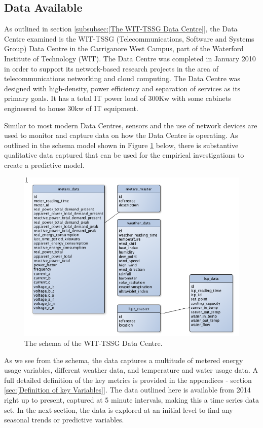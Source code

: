 \documentclass[12pt]{scrartcl}
\begin{document}
\subsection{Data Available}
\label{subsec:[Data Available]}
As outlined in section \ref{subsubsec:[The WIT-TSSG Data Centre]}, the Data Centre examined is the WIT-TSSG (Telecommunications, Software and Systems Group) Data Centre in the Carriganore West Campus, part of the Waterford Institute of Technology (WIT). The Data Centre was completed in January 2010 in order to support its network-based research projects in the area of telecommunications networking and cloud computing. The Data Centre was designed with high-density, power efficiency and separation of services as its primary goals. It has a total IT power load of 300Kw with some cabinets engineered to house 30kw of IT equipment.

Similar to most modern Data Centres, sensors and the use of network devices are used to monitor and capture data on how the Data Centre is operating. As outlined in the schema model shown in Figure \ref{fig:TSSGdataschema} below, there is substantive qualitative data captured that can be used for the empirical investigations to create a predictive model.  

\begin{figure}[h]
  \caption{The schema of the WIT-TSSG Data Centre.}
  \label{fig:TSSGdataschema}
  \centering
    \includegraphics[scale=0.45]{TSSG_Data_Schema.png}
\end{figure}

As we see from the schema, the data captures a multitude of metered energy usage variables, different weather data, and temperature and water usage data. A full detailed definition of the key metrics is provided in the appendices - section \ref{sec:[Definition of key Variables]}. The data outlined here is available from 2014 right up to present, captured at 5 minute intervals, making this a time series data set. In the next section, the data is explored at an initial level to find any seasonal trends or predictive variables. 
 
\end{document}
